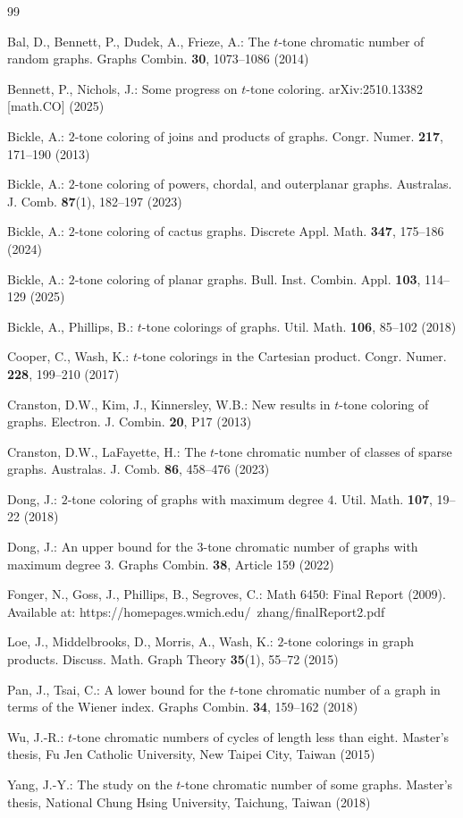 \documentclass[12pt]{article}
\numberwithin{theorem}{section}
\numberwithin{conjecture}{section}
\numberwithin{corollary}{section}
\numberwithin{example}{section}
\numberwithin{lemma}{section}
\numberwithin{proposition}{section}
\numberwithin{problem}{section}
\numberwithin{remark}{section}
\numberwithin{claim}{theorem}
\numberwithin{definition}{section}
\begin{document}
\begin{thebibliography}{99}

Bal, D., Bennett, P., Dudek, A., Frieze, A.:
The $t$-tone chromatic number of random graphs.
Graphs Combin. \textbf{30}, 1073--1086 (2014)

Bennett, P., Nichols, J.:
Some progress on $t$-tone coloring.
arXiv:2510.13382 [math.CO] (2025)

Bickle, A.:
$2$-tone coloring of joins and products of graphs.
Congr. Numer. \textbf{217}, 171--190 (2013)

Bickle, A.:
$2$-tone coloring of powers, chordal, and outerplanar graphs.
Australas. J. Comb. \textbf{87}(1), 182--197 (2023)

Bickle, A.:
$2$-tone coloring of cactus graphs.
Discrete Appl. Math. \textbf{347}, 175--186 (2024)

Bickle, A.:
$2$-tone coloring of planar graphs.
Bull. Inst. Combin. Appl. \textbf{103}, 114--129 (2025)

Bickle, A., Phillips, B.:
$t$-tone colorings of graphs.
Util. Math. \textbf{106}, 85--102 (2018)

Cooper, C., Wash, K.:
$t$-tone colorings in the Cartesian product.
Congr. Numer. \textbf{228}, 199--210 (2017)

Cranston, D.W., Kim, J., Kinnersley, W.B.:
New results in $t$-tone coloring of graphs.
Electron. J. Combin. \textbf{20}, P17 (2013)

Cranston, D.W., LaFayette, H.:
The $t$-tone chromatic number of classes of sparse graphs.
Australas. J. Comb. \textbf{86}, 458--476 (2023)

Dong, J.:
$2$-tone coloring of graphs with maximum degree $4$.
Util. Math. \textbf{107}, 19--22 (2018)

Dong, J.:
An upper bound for the $3$-tone chromatic number of graphs with maximum degree $3$. Graphs Combin. \textbf{38}, Article 159 (2022)

Fonger, N., Goss, J., Phillips, B., Segroves, C.:
Math 6450: Final Report (2009).
Available at: https://homepages.wmich.edu/~zhang/finalReport2.pdf

Loe, J., Middelbrooks, D., Morris, A., Wash, K.:
$2$-tone colorings in graph products. Discuss. Math. Graph Theory \textbf{35}(1), 55--72 (2015)

Pan, J., Tsai, C.:
A lower bound for the $t$-tone chromatic number of a graph in terms of the Wiener index. Graphs Combin. \textbf{34}, 159--162 (2018)

Wu, J.-R.:
$t$-tone chromatic numbers of cycles of length less than eight.
Master's thesis, Fu Jen Catholic University, New Taipei City, Taiwan (2015)

Yang, J.-Y.:
The study on the $t$-tone chromatic number of some graphs.
Master's thesis, National Chung Hsing University, Taichung, Taiwan (2018)\end{thebibliography}
\end{document}
